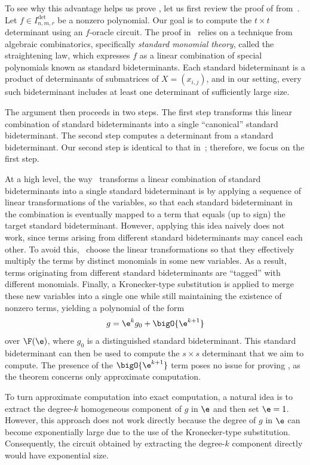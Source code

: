 \documentclass[letterpaper, 11pt]{amsart}
\begin{document}
To see why this advantage helps us prove , let us first review the proof of  from~\cite{AF21}.
Let $f \in I^{\det}_{n,m,r}$ be a nonzero polynomial.
Our goal is to compute the $t \times t$ determinant using an $f$-oracle circuit.
The proof in~\cite{AF21} relies on a technique from algebraic combinatorics, specifically \emph{standard monomial theory}, called the straightening law, which expresses $f$ as a linear combination of special polynomials known as standard bideterminants.
Each standard bideterminant is a product of determinants of submatrices of $X = (x_{i,j})$, and in our setting, every such bideterminant includes at least one determinant of sufficiently large size.

The argument then proceeds in two steps.
The first step transforms this linear combination of standard bideterminants into a single ``canonical'' standard bideterminant.
The second step computes a determinant from a standard bideterminant.
Our second step is identical to that in~\cite{AF21}; therefore, we focus on the first step.

At a high level, the way~\cite{AF21} transforms a linear combination of standard bideterminants into a single standard bideterminant is by applying a sequence of linear transformations of the variables, so that each standard bideterminant in the combination is eventually mapped to a term that equals (up to sign) the target standard bideterminant.
However, applying this idea naively does not work, since terms arising from different standard bideterminants may cancel each other.
To avoid this,~\cite{AF21} choose the linear transformations so that they effectively multiply the terms by distinct monomials in some new variables.
As a result, terms originating from different standard bideterminants are ``tagged'' with different monomials.
Finally, a Kronecker-type substitution is applied to merge these new variables into a single one while still maintaining the existence of nonzero terms, yielding a polynomial of the form 
\[
    g = \e^k g_0 + \bigO{\e^{k+1}}
\]
over $\F(\e)$, where $g_0$ is a distinguished standard bideterminant. 
This standard bideterminant can then be used to compute the $s \times s$ determinant that we aim to compute.
The presence of the $\bigO{\e^{k+1}}$ term poses no issue for proving , as the theorem concerns only approximate computation.

To turn approximate computation into exact computation, a natural idea is to extract the degree-$k$ homogeneous component of $g$ in $\e$ and then set $\e = 1$.
However, this approach does not work directly because the degree of $g$ in $\e$ can become exponentially large due to the use of the Kronecker-type substitution.
Consequently, the circuit obtained by extracting the degree-$k$ component directly would have exponential size.
\end{document}
